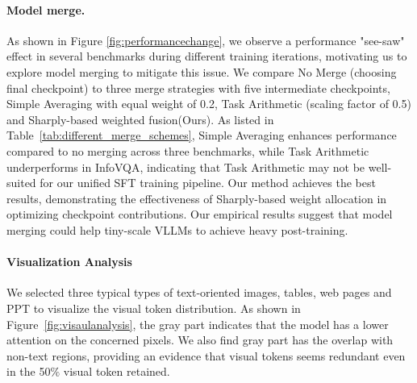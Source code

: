 \paragraph{Model merge.}
As shown in Figure \ref{fig:performancechange}, we 
observe a performance "see-saw" effect in several benchmarks during different training iterations, motivating us to explore model merging to mitigate this issue.
We compare No Merge (choosing final checkpoint) to three merge strategies with  five intermediate checkpoints, Simple Averaging with equal weight of 0.2, Task Arithmetic \cite{ilharco2022editing} (scaling factor of 0.5) and Sharply-based weighted fusion(Ours). 
As listed in Table~\ref{tab:different_merge_schemes}, Simple Averaging enhances performance compared to no merging across three benchmarks, while Task Arithmetic underperforms in InfoVQA, indicating that Task Arithmetic may not be well-suited for our unified SFT training pipeline. Our method achieves the best results, demonstrating the effectiveness of Sharply-based weight allocation in optimizing checkpoint contributions. Our empirical results suggest that model merging could help tiny-scale VLLMs to achieve heavy post-training.

\begin{table}[ht]
    \setlength{\tabcolsep}{5pt}
    \renewcommand{\arraystretch}{1.2}
    \centering
    \caption{Performance of Different Merge Schemes on FCoT-VL-2B.}
\label{tab:different_merge_schemes}
\end{table}
\paragraph{Visualization Analysis}
We selected three typical types of text-oriented images, tables, web pages and PPT to visualize the visual token distribution.
As shown in Figure~\ref{fig:visaulanalysis}, the gray part indicates that the model has a lower attention on the concerned pixels. We also find gray part has the overlap with non-text regions, providing an evidence that visual tokens seems redundant even in the 50$\%$ visual token retained.

